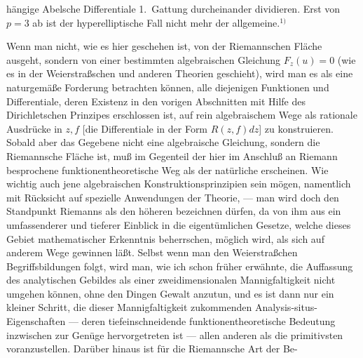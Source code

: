 \documentclass{article}
\begin{document}
hängige Abelsche Differentiale 1.\ Gattung durcheinander dividieren. Erst von $p = 3$ ab ist der hyperelliptische Fall nicht mehr der allgemeine.${}^{1)}$

Wenn man nicht, wie es hier geschehen ist, von der Riemannschen Fläche ausgeht, sondern von einer bestimmten algebraischen Gleichung $F_z(u) = 0$ (wie es in der Weierstraßschen und anderen Theorien geschieht), wird man es als eine naturgemäße Forderung betrachten können, alle diejenigen Funktionen und Differentiale, deren Existenz in den vorigen Abschnitten mit Hilfe des Dirichletschen Prinzipes erschlossen ist, auf rein algebraischem Wege als rationale Ausdrücke in $z, f$ [die Differentiale in der Form $R(z, f)dz$] zu konstruieren. Sobald aber das Gegebene nicht eine algebraische Gleichung, sondern die Riemannsche Fläche ist, muß im Gegenteil der hier im Anschluß an Riemann besprochene funktionentheoretische Weg als der natürliche erscheinen. Wie wichtig auch jene algebraischen Konstruktionsprinzipien sein mögen, namentlich mit Rücksicht auf spezielle Anwendungen der Theorie, --- man wird doch den Standpunkt Riemanns als den höheren bezeichnen dürfen, da von ihm aus ein umfassenderer und tieferer Einblick in die eigentümlichen Gesetze, welche dieses Gebiet mathematischer Erkenntnis beherrschen, möglich wird, als sich auf anderem Wege gewinnen läßt. Selbst wenn man den Weierstraßchen Begriffsbildungen folgt, wird man, wie ich schon früher erwähnte, die Auffassung des analytischen Gebildes als einer zweidimensionalen Mannigfaltigkeit nicht umgehen können, ohne den Dingen Gewalt anzutun, und es ist dann nur ein kleiner Schritt, die dieser Mannigfaltigkeit zukommenden Analysis-situs-Eigenschaften --- deren tiefeinschneidende funktionentheoretische Bedeutung inzwischen zur Genüge hervorgetreten ist --- allen anderen als die primitivsten voranzustellen. Darüber hinaus ist für die Riemannsche Art der Be-
\end{document}
